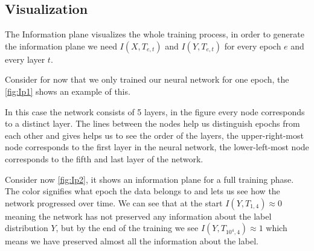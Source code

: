 \documentclass[dissertation.tex]{subfiles}
\begin{document}
\subsection{Visualization}

The Information plane visualizes the whole training process, in order to
generate the information plane we need $I(X,T_{e,t})$ and $I(Y,T_{e,t})$ for every
epoch $e$ and every layer $t$.

Consider for now that we only trained our neural network for one epoch, the
\autoref{fig:Ip1} shows an example of this. 

In this case the network consists of 5 layers, in the figure every node
corresponds to a distinct layer. The lines between the nodes help us distinguish
epochs from each other and gives helps us to see the order of the layers, the
upper-right-most node corresponds to the first layer in the neural network, the
lower-left-most node corresponds to the fifth and last layer of the network.

Consider now \autoref{fig:Ip2}, it shows an information plane for a full
training phase. The color signifies what epoch the data belongs to and lets us
see how the network progressed over time. We can see that at the start $I(Y,
T_{1,4}) \approx 0$ meaning the network has not preserved any information about
the label distribution $Y$, but by the end of the training we see $I(Y,
T_{10^4,4}) \approx 1$ which means we have preserved almost all the information
about the label.
\end{document}
